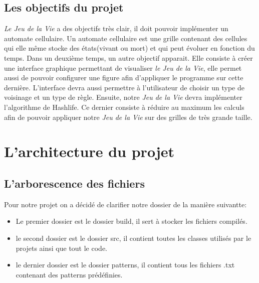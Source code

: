 \documentclass{article}
\begin{document}
\subsection{Les objectifs du projet}

\textit{Le Jeu de la Vie} a des objectifs très clair, il doit pouvoir implémenter un automate cellulaire. Un automate cellulaire est une grille contenant des cellules qui elle même stocke des états(vivant ou mort) et qui peut évoluer en fonction du temps. Dans un deuxième temps, un autre objectif apparait. Elle consiste à créer une interface graphique permettant de visualiser \textit{le Jeu de la Vie}, elle permet aussi de pouvoir configurer une figure afin d'appliquer le programme sur cette dernière. L'interface devra aussi permettre à l'utilisateur de choisir un type de voisinage et un type de règle. Ensuite, notre \textit{Jeu de la Vie} devra implémenter l'algorithme de Hashlife. Ce dernier consiste à réduire au maximum les calculs afin de pouvoir appliquer notre \textit{Jeu de la Vie} sur des grilles de très grande taille.

\section{L'architecture du projet}
\subsection{L'arborescence des fichiers}
Pour notre projet on a décidé de clarifier notre dossier de la manière suivantte: 
\begin{itemize}
    \item Le premier dossier est le dossier build, il sert à stocker les fichiers compilés.
    \item le second dossier est le dossier src, il contient toutes les classes utilisés par le projets ainsi que tout le code.
    \item le dernier dossier est le dossier patterns, il contient tous les fichiers .txt contenant des patterns prédéfinies. 
\end{itemize}
\end{document}
